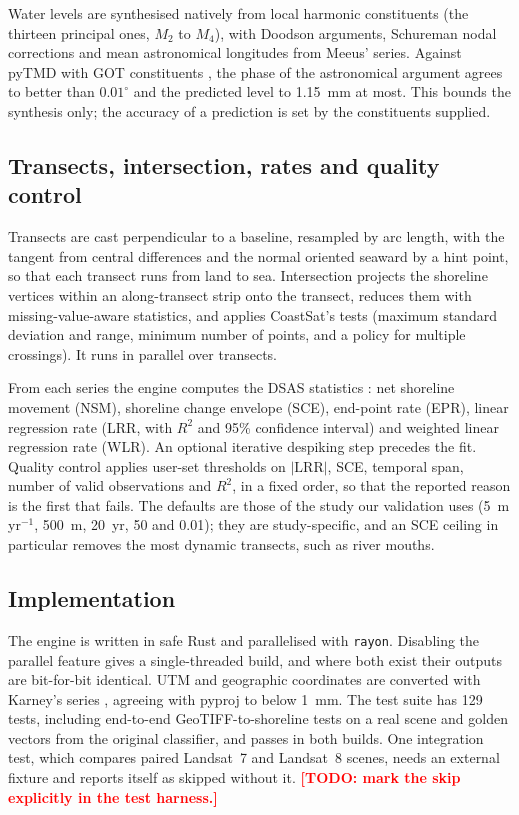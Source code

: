 \documentclass[authoryear,preprint,review,12pt]{elsarticle}
\newcommand{\todo}[1]{\textcolor{red}{\textbf{[TODO: #1]}}}
\begin{document}
Water levels are synthesised natively from local harmonic constituents (the
thirteen principal ones, $M_2$ to $M_4$), with Doodson arguments, Schureman
nodal corrections and mean astronomical longitudes from Meeus' series. Against
pyTMD \citep{Padman_2021} with GOT constituents \citep{Ray_2025_GOT5}, the
phase of the astronomical argument agrees to better than $0.01^\circ$ and the
predicted level to 1.15~mm at most. This bounds the synthesis only; the
accuracy of a prediction is set by the constituents supplied.

\subsection{Transects, intersection, rates and quality control}
Transects are cast perpendicular to a baseline, resampled by arc length, with
the tangent from central differences and the normal oriented seaward by a hint
point, so that each transect runs from land to sea. Intersection projects the
shoreline vertices within an along-transect strip onto the transect, reduces
them with missing-value-aware statistics, and applies CoastSat's tests (maximum
standard deviation and range, minimum number of points, and a policy for
multiple crossings). It runs in parallel over transects.

From each series the engine computes the DSAS statistics
\citep{Himmelstoss_2021_DSAS}: net shoreline movement (NSM), shoreline change
envelope (SCE), end-point rate (EPR), linear regression rate (LRR, with $R^2$
and 95\% confidence interval) and weighted linear regression rate (WLR). An
optional iterative despiking step precedes the fit. Quality control applies
user-set thresholds on $|\mathrm{LRR}|$, SCE, temporal span, number of valid
observations and $R^2$, in a fixed order, so that the reported reason is the
first that fails. The defaults are those of the study our validation uses
(5~m\,yr$^{-1}$, 500~m, 20~yr, 50 and 0.01); they are study-specific, and an SCE
ceiling in particular removes the most dynamic transects, such as river
mouths.

\subsection{Implementation}
The engine is written in safe Rust and parallelised with \texttt{rayon}.
Disabling the parallel feature gives a single-threaded build, and where both
exist their outputs are bit-for-bit identical. UTM and geographic coordinates
are converted with Karney's series \citep{karney2011tm}, agreeing with pyproj
to below 1~mm. The test suite has 129 tests, including end-to-end
GeoTIFF-to-shoreline tests on a real scene and golden vectors from the original
classifier, and passes in both builds. One integration test, which compares
paired Landsat~7 and Landsat~8 scenes, needs an external fixture and reports
itself as skipped without it. \todo{mark the skip explicitly in the test
harness.}
\end{document}
